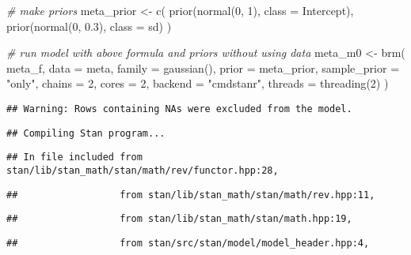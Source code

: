 \documentclass[
]{article}
\newenvironment{Shaded}{\begin{snugshade}}{\end{snugshade}}
\newcommand{\AttributeTok}[1]{\textcolor[rgb]{0.77,0.63,0.00}{#1}}
\newcommand{\CommentTok}[1]{\textcolor[rgb]{0.56,0.35,0.01}{\textit{#1}}}
\newcommand{\DecValTok}[1]{\textcolor[rgb]{0.00,0.00,0.81}{#1}}
\newcommand{\FloatTok}[1]{\textcolor[rgb]{0.00,0.00,0.81}{#1}}
\newcommand{\FunctionTok}[1]{\textcolor[rgb]{0.00,0.00,0.00}{#1}}
\newcommand{\NormalTok}[1]{#1}
\newcommand{\OtherTok}[1]{\textcolor[rgb]{0.56,0.35,0.01}{#1}}
\newcommand{\StringTok}[1]{\textcolor[rgb]{0.31,0.60,0.02}{#1}}
\begin{document}
\begin{Shaded}
\begin{Highlighting}[]
\CommentTok{\# make priors}
\NormalTok{meta\_prior }\OtherTok{\textless{}{-}} \FunctionTok{c}\NormalTok{(}
  \FunctionTok{prior}\NormalTok{(}\FunctionTok{normal}\NormalTok{(}\DecValTok{0}\NormalTok{, }\DecValTok{1}\NormalTok{), }\AttributeTok{class =}\NormalTok{ Intercept),}
  \FunctionTok{prior}\NormalTok{(}\FunctionTok{normal}\NormalTok{(}\DecValTok{0}\NormalTok{, }\FloatTok{0.3}\NormalTok{), }\AttributeTok{class =}\NormalTok{ sd)}
\NormalTok{)}

\CommentTok{\# run model with above formula and priors without using data}
\NormalTok{meta\_m0 }\OtherTok{\textless{}{-}} \FunctionTok{brm}\NormalTok{(}
\NormalTok{  meta\_f,}
  \AttributeTok{data =}\NormalTok{ meta,}
  \AttributeTok{family =} \FunctionTok{gaussian}\NormalTok{(),}
  \AttributeTok{prior =}\NormalTok{ meta\_prior,}
  \AttributeTok{sample\_prior =} \StringTok{"only"}\NormalTok{,}
  \AttributeTok{chains =} \DecValTok{2}\NormalTok{,}
  \AttributeTok{cores =} \DecValTok{2}\NormalTok{,}
  \AttributeTok{backend =} \StringTok{"cmdstanr"}\NormalTok{,}
  \AttributeTok{threads =} \FunctionTok{threading}\NormalTok{(}\DecValTok{2}\NormalTok{)}
\NormalTok{)}
\end{Highlighting}
\end{Shaded}

\begin{verbatim}
## Warning: Rows containing NAs were excluded from the model.
\end{verbatim}

\begin{verbatim}
## Compiling Stan program...
\end{verbatim}

\begin{verbatim}
## In file included from stan/lib/stan_math/stan/math/rev/functor.hpp:28,
\end{verbatim}

\begin{verbatim}
##                  from stan/lib/stan_math/stan/math/rev.hpp:11,
\end{verbatim}

\begin{verbatim}
##                  from stan/lib/stan_math/stan/math.hpp:19,
\end{verbatim}

\begin{verbatim}
##                  from stan/src/stan/model/model_header.hpp:4,
\end{verbatim}
\end{document}
